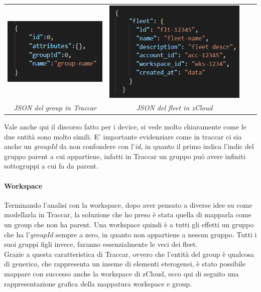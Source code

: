 \documentclass[a4paper,titlepage,12pt]{book}
\begin{document}
\begin{center}

\begin{tabular}{c c c c}

    \includegraphics[scale=0.8]{images/traccGr.png}

    \label{fig:my_label}

 &  
\includegraphics[scale=0.7]{images/zClGr.png} \\
\textit{JSON del group in Traccar} &  \textit{JSON del fleet in zCloud}
\end{tabular}
\end{center}\par\medskip


Vale anche qui il discorso fatto per i device, si vede molto chiaramente come le due entità sono molto simili. E' importante evidenziare come in traccar ci sia anche un \textit{groupId} da non confondere con l'\textit{id}, in quanto il primo indica l'indic del gruppo parent a cui appartiene, infatti in Traccar un gruppo può avere infiniti sottogruppi a cui fa da parent. 

\paragraph{
\sffamily Workspace}
Terminando l'analisi con la workspace, dopo aver pensato a diverse idee su come modellarla in Traccar, la soluzione che ho preso è stata quella di mapparla come un group che non ha parent. Una workspace quindi è a tutti gli effetti un gruppo che ha l'\textit{groupId} sempre a zero, in quanto non appartiene a nessun gruppo. Tutti i suoi gruppi figli invece, faranno essenzialmente le veci dei fleet.\\
Grazie a questa caratteristica di Traccar, ovvero che l'entità del group è qualcosa di generico, che rappresenta un inseme di elementi eterogenei, è stato possibile mappare con successo anche la workspace di zCloud, ecco qui di seguito una rappresentazione grafica della mappatura workspace e group.
\end{document}
